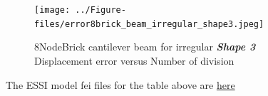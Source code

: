 \documentclass[fleqn,11pt]{article}
\begin{document}
\begin{figure}[H]
    \centering
    \texttt{[image: ../Figure-files/error8brick\_beam\_irregular\_shape3.jpeg]}
  \captionsetup{justification=centering,margin=3cm}
  \caption{8NodeBrick cantilever beam for irregular \emph{\textbf{Shape 3}}\\
      Displacement error   versus   Number of division}
  \label{fig shape 3 8NodeBrick cantilever beam for irregular more elements}
\end{figure}



The ESSI model fei files for the table above are \href{https://github.com/yuan-energy/ESSI_Verification/blob/master/8NodeBrick/cantilever_irregular_element_cut/cantilever_irregular_element_cut.tar.gz?raw=true}{here}



















\end{document}
